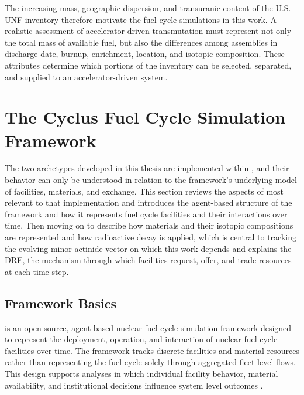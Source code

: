 The increasing mass, geographic dispersion, and transuranic content of the
U.S. \gls{UNF} inventory therefore motivate the fuel cycle simulations in this
work. A realistic assessment of accelerator-driven transmutation must
represent not only the total mass of available fuel, but also the differences
among assemblies in discharge date, burnup, enrichment, location, and
isotopic composition. These attributes determine which portions of the
inventory can be selected, separated, and supplied to an accelerator-driven
system.

\section{The Cyclus Fuel Cycle Simulation Framework}
\label{sec:cyclus}

The two archetypes developed in this thesis are implemented within \Cyclus,
and their behavior can only be understood in relation to the framework's
underlying model of facilities, materials, and exchange. This section reviews
the aspects of \Cyclus most relevant to that implementation and introduces the agent-based
structure of the framework and how it represents fuel cycle facilities and
their interactions over time. Then moving on to describe how materials and their
isotopic compositions are represented and how radioactive decay is applied,
which is central to tracking the evolving minor actinide vector on which this
work depends and explains the \gls{DRE}, the mechanism through
which facilities request, offer, and trade resources at each time step.

\subsection{Framework Basics}
\label{subsec:cyclus-framework-basics}

\Cyclus is an open-source, agent-based nuclear fuel cycle simulation
framework designed to represent the deployment, operation, and interaction
of nuclear fuel cycle facilities over time. The framework tracks discrete
facilities and material resources rather than representing the fuel cycle
solely through aggregated fleet-level flows. This design supports analyses
in which individual facility behavior, material availability, and institutional
decisions influence system level outcomes
\cite{huff_fundamental_2016}.

